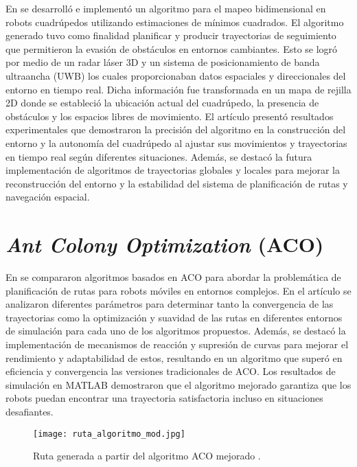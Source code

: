 En \cite{li_quadruped_2022} se desarrolló e implementó un algoritmo para el mapeo bidimensional en robots cuadrúpedos utilizando estimaciones de mínimos cuadrados. El algoritmo generado tuvo como finalidad planificar y producir trayectorias de seguimiento que permitieron la evasión de obstáculos en entornos cambiantes. Esto se logró por medio de un radar láser 3D y un sistema de posicionamiento de banda ultraancha (UWB) los cuales proporcionaban datos espaciales y direccionales del entorno en tiempo real. Dicha información fue transformada en un mapa de rejilla 2D donde se estableció la ubicación actual del cuadrúpedo, la presencia de obstáculos y los espacios libres de movimiento. El artículo presentó resultados experimentales que demostraron la precisión del algoritmo en la construcción del entorno y la autonomía del cuadrúpedo al ajustar sus movimientos y trayectorias en tiempo real según diferentes situaciones. Además, se destacó la futura implementación de algoritmos de trayectorias globales y locales para mejorar la reconstrucción del entorno y la estabilidad del sistema de planificación de rutas y navegación espacial.

\section{\textit{Ant Colony Optimization} (ACO)}

En \cite{dai_mobile_2019} se compararon algoritmos basados en ACO para abordar la problemática de planificación de rutas para robots móviles en entornos complejos. En el artículo se analizaron diferentes parámetros para determinar tanto la convergencia de las trayectorias como la optimización y suavidad de las rutas en diferentes entornos de simulación para cada uno de los algoritmos propuestos. Además, se destacó la implementación de mecanismos de reacción y supresión de curvas para mejorar el rendimiento y adaptabilidad de estos, resultando en un algoritmo que superó en eficiencia y convergencia las versiones tradicionales de ACO. Los resultados de simulación en MATLAB demostraron que el algoritmo mejorado garantiza que los robots puedan encontrar una trayectoria satisfactoria incluso en situaciones desafiantes.


\begin{figure}[H]
	\centering
	\texttt{[image: ruta\_algoritmo\_mod.jpg]}
	\caption{Ruta generada a partir del algoritmo ACO mejorado \cite{dai_mobile_2019}.}
	\label{fig2_2}
\end{figure}

